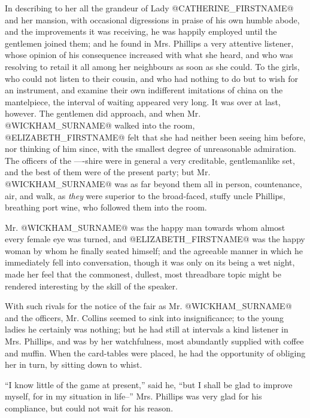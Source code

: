 In describing to her all the grandeur of Lady @CATHERINE_FIRSTNAME@ and her mansion,
with occasional digressions in praise of his own humble abode, and
the improvements it was receiving, he was happily employed until the
gentlemen joined them; and he found in Mrs. Phillips a very attentive
listener, whose opinion of his consequence increased with what she
heard, and who was resolving to retail it all among her neighbours as
soon as she could. To the girls, who could not listen to their cousin,
and who had nothing to do but to wish for an instrument, and examine
their own indifferent imitations of china on the mantelpiece, the
interval of waiting appeared very long. It was over at last, however.
The gentlemen did approach, and when Mr. @WICKHAM_SURNAME@ walked into the room,
@ELIZABETH_FIRSTNAME@ felt that she had neither been seeing him before, nor thinking
of him since, with the smallest degree of unreasonable admiration.
The officers of the ----shire were in general a very creditable,
gentlemanlike set, and the best of them were of the present party; but
Mr. @WICKHAM_SURNAME@ was as far beyond them all in person, countenance, air, and
walk, as \textit{they} were superior to the broad-faced, stuffy uncle Phillips,
breathing port wine, who followed them into the room.

Mr. @WICKHAM_SURNAME@ was the happy man towards whom almost every female eye was
turned, and @ELIZABETH_FIRSTNAME@ was the happy woman by whom he finally seated
himself; and the agreeable manner in which he immediately fell into
conversation, though it was only on its being a wet night, made her feel
that the commonest, dullest, most threadbare topic might be rendered
interesting by the skill of the speaker.

With such rivals for the notice of the fair as Mr. @WICKHAM_SURNAME@ and the
officers, Mr. Collins seemed to sink into insignificance; to the young
ladies he certainly was nothing; but he had still at intervals a kind
listener in Mrs. Phillips, and was by her watchfulness, most abundantly
supplied with coffee and muffin. When the card-tables were placed, he
had the opportunity of obliging her in turn, by sitting down to whist.

``I know little of the game at present,'' said he, ``but I shall be glad
to improve myself, for in my situation in life--'' Mrs. Phillips was very
glad for his compliance, but could not wait for his reason.

